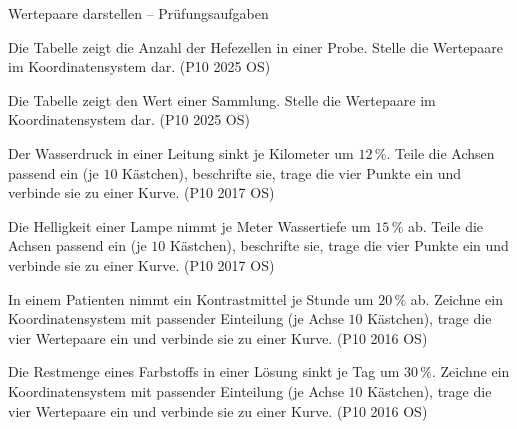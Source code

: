 \begin{aufgabe}{Wertepaare darstellen – Prüfungsaufgaben}
\begin{teile}
\teil Die Tabelle zeigt die Anzahl der Hefezellen in einer Probe. Stelle die Wertepaare im Koordinatensystem dar. \hfill (P10 2025 OS) 

\begin{ksys}[xmin=0,xmax=5,ymin=0,ymax=350,xstep=1,ystep=50,xlabel=Zeit in h,ylabel=Zellen]  \end{ksys}
\teil Die Tabelle zeigt den Wert einer Sammlung. Stelle die Wertepaare im Koordinatensystem dar. \hfill (P10 2025 OS) 

\begin{ksys}[xmin=0,xmax=5,ymin=0,ymax=800,xstep=1,ystep=100,xlabel=Jahr,ylabel=Euro]  \end{ksys}
\teil Der Wasserdruck in einer Leitung sinkt je Kilometer um $12\,\%$. Teile die Achsen passend ein (je $10$ Kästchen), beschrifte sie, trage die vier Punkte ein und verbinde sie zu einer Kurve. \hfill (P10 2017 OS) 

\begin{ksys}[xmin=0,xmax=10,ymin=0,ymax=10]  \end{ksys}
\teil Die Helligkeit einer Lampe nimmt je Meter Wassertiefe um $15\,\%$ ab. Teile die Achsen passend ein (je $10$ Kästchen), beschrifte sie, trage die vier Punkte ein und verbinde sie zu einer Kurve. \hfill (P10 2017 OS) 

\begin{ksys}[xmin=0,xmax=10,ymin=0,ymax=10]  \end{ksys}
\steil In einem Patienten nimmt ein Kontrastmittel je Stunde um $20\,\%$ ab. Zeichne ein Koordinatensystem mit passender Einteilung (je Achse $10$ Kästchen), trage die vier Wertepaare ein und verbinde sie zu einer Kurve. \hfill (P10 2016 OS) 

\begin{ksys}[xmin=0,xmax=10,ymin=0,ymax=10]  \end{ksys}
\steil Die Restmenge eines Farbstoffs in einer Lösung sinkt je Tag um $30\,\%$. Zeichne ein Koordinatensystem mit passender Einteilung (je Achse $10$ Kästchen), trage die vier Wertepaare ein und verbinde sie zu einer Kurve. \hfill (P10 2016 OS) 

\begin{ksys}[xmin=0,xmax=10,ymin=0,ymax=10]  \end{ksys}
\end{teile}
\end{aufgabe}


